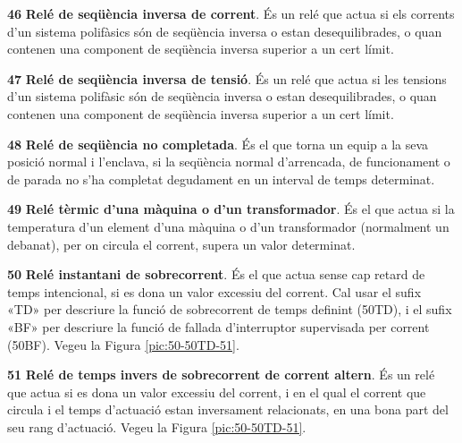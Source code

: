 \begin{multicols}{2}
\begin{list}{}
\item[\textbf{46}]   
\textbf{Relé de seqüència inversa de corrent}. És un relé que actua si els corrents
 d'un sistema polifàsics són de seqüència inversa o estan
desequilibrades, o quan contenen una component de seqüència inversa
superior a un cert límit.

\item[\textbf{47}]   
\textbf{Relé de seqüència inversa de tensió}. És un relé que actua si les tensions d'un sistema polifàsic són de seqüència inversa o estan
desequilibrades, o quan contenen una component de seqüència inversa
superior a un cert límit.

\item[\textbf{48}]   
\textbf{Relé de seqüència no completada}. És el que torna un equip a la seva posició normal  i
l'enclava, si la seqüència normal d'arrencada, de funcionament o de
parada no s'ha completat degudament en un interval de temps
determinat.

\item[\textbf{49}]  
\textbf{Relé tèrmic d'una màquina o d'un transformador}. És el que
actua si la temperatura d'un element d'una màquina o d'un
transformador (normalment un debanat), per on circula el corrent,
supera un valor determinat.

\item[\textbf{50}]   
\textbf{Relé instantani de sobrecorrent}. És el que actua sense cap retard de temps intencional, si es dona un valor excessiu del
corrent. Cal usar el sufix «TD» per descriure la funció de sobrecorrent de temps definint (50TD), i el sufix «BF» per descriure la funció de fallada d'interruptor supervisada per corrent (50BF). Vegeu la Figura \vref{pic:50-50TD-51}.

\item[\textbf{51}]  
\textbf{Relé de temps invers  de sobrecorrent de corrent altern}. És
un relé que actua si es dona un valor excessiu del corrent, i en el qual el corrent que circula i el temps d'actuació estan inversament relacionats, en una bona part del seu rang d'actuació. Vegeu la Figura \vref{pic:50-50TD-51}.


\end{list}
\end{multicols}
